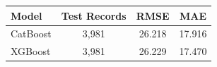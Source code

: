 \begin{tabular}{lccc}
\toprule
Model & Test Records & RMSE & MAE \\ \midrule
CatBoost & 3,981 & 26.218 & 17.916 \\
XGBoost & 3,981 & 26.229 & 17.470 \\
\bottomrule
\end{tabular}
